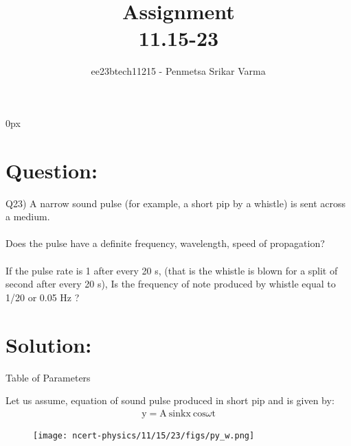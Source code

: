 \documentclass[beamer]{IEEEtran}
\theoremstyle{remark}
\begin{document}
\parindent 0px


\title{Assignment\\[1ex]11.15-23}
\author{ee23btech11215 - Penmetsa Srikar Varma$^{}$%
}
\maketitle
\newpage
\bigskip

\renewcommand{\thefigure}{\theenumi}
\renewcommand{\thetable}{\theenumi}
\section*{Question:}
Q23) A narrow sound pulse (for example, a short pip by a whistle) is sent across a
medium.\\\\  Does the pulse have a definite  frequency,  wavelength,  speed
of propagation?\\\\  If the pulse rate is 1 after every 20 s, (that is the whistle is
blown for a split of second after every 20 s), Is the frequency of note produced
by whistle equal to 1/20 or 0.05 Hz ?
\section*{Solution:}
{\centering
Table of Parameters\\
}
\begin{table}[h]
    \centering
    
    \label{tab:t1}
\end{table}

 Let us assume, equation of sound pulse  produced in short pip and is given by:\\
\begin{align}
    \label{a1}
    \text{y}=\text{A}\ \text{sin}\text{kx}\ \text{cos}\omega\text{t}
\end{align}
\begin{figure}[h]
    \centering
    \texttt{[image: ncert-physics/11/15/23/figs/py\_w.png]}
    \label{fig:enter-label}
\end{figure}
\end{document}
